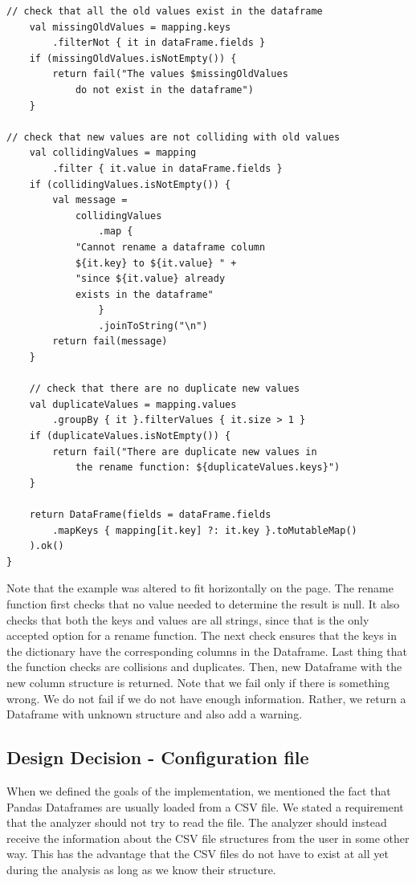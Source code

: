 \begin{lstlisting}[caption=The rename function of DataFrame\_RenameFunc, label={lst:rename_invoke}, captionpos=b]
    // check that all the old values exist in the dataframe
    val missingOldValues = mapping.keys
        .filterNot { it in dataFrame.fields }
    if (missingOldValues.isNotEmpty()) {
        return fail("The values $missingOldValues
            do not exist in the dataframe")
    }

// check that new values are not colliding with old values
    val collidingValues = mapping
        .filter { it.value in dataFrame.fields }
    if (collidingValues.isNotEmpty()) {
        val message =
            collidingValues
                .map {
            "Cannot rename a dataframe column
            ${it.key} to ${it.value} " +
            "since ${it.value} already
            exists in the dataframe"
                }
                .joinToString("\n")
        return fail(message)
    }

    // check that there are no duplicate new values
    val duplicateValues = mapping.values
        .groupBy { it }.filterValues { it.size > 1 }
    if (duplicateValues.isNotEmpty()) {
        return fail("There are duplicate new values in
            the rename function: ${duplicateValues.keys}")
    }

    return DataFrame(fields = dataFrame.fields
        .mapKeys { mapping[it.key] ?: it.key }.toMutableMap()
    ).ok()
}
\end{lstlisting}

Note that the example was altered to fit horizontally on the page.
The rename function first checks that no value needed to determine the result is null.
It also checks that both the keys and values are all strings, since that is the only accepted option for a rename
function.
The next check ensures that the keys in the dictionary have the corresponding columns in the Dataframe.
Last thing that the function checks are collisions and duplicates.
Then, new Dataframe with the new column structure is returned.
Note that we fail only if there is something wrong.
We do not fail if we do not have enough information.
Rather, we return a Dataframe with unknown structure and also add a warning.

\subsection{Design Decision - Configuration file}\label{subsec:configuration-file}

When we defined the goals of the implementation, we mentioned the fact that Pandas Dataframes are usually loaded
from a CSV file.
We stated a requirement that the analyzer should not try to read the file.
The analyzer should instead receive the information about the CSV file structures from the user in some other way.
This has the advantage that the CSV files do not have to exist at all yet during the analysis as long as we know their
structure.


